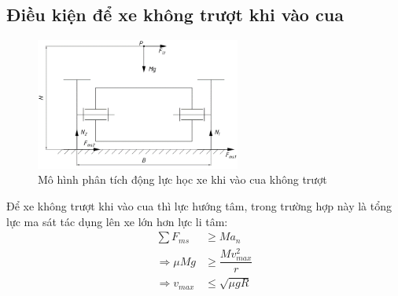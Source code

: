         \subsection{Điều kiện để xe không trượt khi vào cua}
            \begin{figure}[H]
                \centering
                \includegraphics[width=0.6\textwidth]{pictures/chapter3/c3_p3_TurningAnalysis2.png}
                \caption{Mô hình phân tích động lực học xe khi vào cua không trượt}
                \label{fig:3.3}
            \end{figure}
            \hspace*{0.6cm}Để xe không trượt khi vào cua thì lực hướng tâm, trong trường hợp này là tổng lực ma sát tác dụng lên xe lớn hơn lực li tâm:
            \begin{align}
                \sum F_{ms} &\geq Ma_n \label{eq:3-12} \\
                \Rightarrow \mu Mg &\geq \dfrac{Mv_{max}^2}{r} \label{eq:3-13} \\
                \Rightarrow v_{max} &\leq \sqrt{\mu gR} \label{eq:3-14}
            \end{align}
